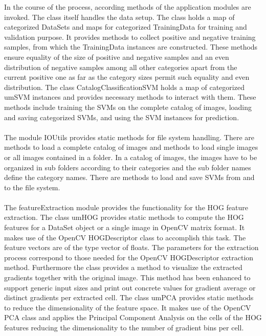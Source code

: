 In the course of the process, according methods of the application modules are invoked. The class itself handles the data setup. The class holds a map of categorized DataSets and maps for categorized TrainingData for training and validation purpose. It provides methods to collect positive and negative training samples, from which the TrainingData instances are constructed. These methods ensure equality of the size of positive and negative samples and an even distribution of negative samples among all other categories apart from the current positive one as far as the category sizes permit such equality and even distribution. The class CatalogClassificationSVM holds a map of categorized umSVM instances and provides necessary methods to interact with them. These methods include training the SVMs on the complete catalog of images, loading and saving categorized SVMs, and using the SVM instances for prediction.
\\
\\
The module IOUtils provides static methods for file system handling. There are methods to load a complete catalog of images and methods to load single images or all images contained in a folder. In a catalog of images, the images have to be organized in sub folders according to their categories and the sub folder names define the category names. There are methods to load and save SVMs from and to the file system.
\\
\\
The featureExtraction module provides the functionality for the HOG feature extraction. The class umHOG provides static methods to compute the HOG features for a DataSet object or a single image in OpenCV matrix format. It makes use of the OpenCV HOGDescriptor class to accomplish this task. The feature vectors are of the type vector of floats. The parameters for the extraction process correspond to those needed for the OpenCV HOGDescriptor extraction method. Furthermore the class provides a method to visualize the extracted gradients together with the original image. This method  has been enhanced to support generic input sizes and print out concrete values for gradient average or distinct gradients per extracted cell. The class umPCA provides static methods to reduce the dimensionality of the feature space. It makes use of the OpenCV PCA class and applies the Principal Component Analysis on the cells of the HOG features reducing the dimensionality to the number of gradient bins per cell.
